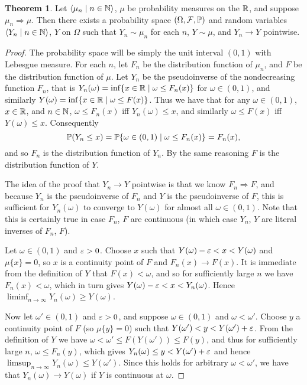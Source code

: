 \documentclass[leqno]{article}
\theoremstyle{definition}
\newtheorem{theorem}{Theorem}[section]
\newcommand{\bldset}[2]{\{{#1}\mid{#2}\}}
\newcommand{\bldseq}[2]{\langle{#1}\mid{#2}\rangle}
\begin{document}
\begin{theorem}
Let $\bldseq{\mu_n}{n \in \N}$, $\mu$ be probability measures on the $\R$, and suppose $\mu_n \Rightarrow \mu$. Then there exists a probability space $(\Omega, \mathcal F, \P)$ and random variables $\bldseq{Y_n}{n \in \N}$, $Y$ on $\Omega$ such that $Y_n \sim \mu_n$ for each $n$, $Y \sim \mu$, and $Y_n \rightarrow Y$ pointwise.
\end{theorem}

\begin{proof}
The probability space will be simply the unit interval $(0,1)$ with Lebesgue measure. For each $n$, let $F_n$ be the distribution function of $\mu_n$, and $F$ be the distribution function of $\mu$. Let $Y_n$ be the pseudoinverse of the nondecreasing function $F_n$, that is $Y_n(\omega) = \inf \bldset{x \in \R}{\omega \le F_n(x)}$ for $\omega \in (0,1)$, and similarly $Y(\omega) = \inf \bldset{x \in \R}{\omega \le F(x)}$. Thus we have that for any $\omega \in (0,1)$, $x \in \R$, and $n \in \N$, $\omega \le F_n(x)$ iff $Y_n(\omega) \le x$, and similarly $\omega \le F(x)$ iff $Y(\omega) \le x$. Consequently
\[ \P(Y_n \le x) = \P \bldset{\omega \in (0,1)}{\omega \le F_n(x)} = F_n(x), \]
and so $F_n$ is the distribution function of $Y_n$. By the same reasoning $F$ is the distribution function of $Y$.

The idea of the proof that $Y_n \rightarrow Y$ pointwise is that we know $F_n \Rightarrow F$, and because $Y_n$ is the pseudoinverse of $F_n$ and $Y$ is the pseudoinverse of $F$, this is sufficient for $Y_n(\omega)$ to converge to $Y(\omega)$ for almost all $\omega \in (0,1)$. Note that this is certainly true in case $F_n$, $F$ are continuous (in which case $Y_n$, $Y$ are literal inverses of $F_n$, $F$).

Let $\omega \in (0,1)$ and $\eps > 0$. Choose $x$ such that $Y(\omega) - \eps < x < Y(\omega)$ and $\mu \{x\} = 0$, so $x$ is a continuity point of $F$ and $F_n(x) \rightarrow F(x)$. It is immediate from the definition of $Y$ that $F(x) < \omega$, and so for sufficiently large $n$ we have $F_n(x) < \omega$, which in turn gives $Y(\omega) - \eps < x < Y_n(\omega)$. Hence $\liminf_{n \rightarrow \infty} Y_n(\omega) \ge Y(\omega)$.

Now let $\omega' \in (0,1)$ and $\eps > 0$, and suppose $\omega \in (0,1)$ and $\omega < \omega'$. Choose $y$ a continuity point of $F$ (so $\mu \{y\} = 0$) such that $Y(\omega') < y < Y(\omega') + \eps$. From the definition of $Y$ we have $\omega < \omega' \le F(Y(\omega')) \le F(y)$, and thus for sufficiently large $n$, $\omega \le F_n(y)$, which gives $Y_n(\omega) \le y < Y(\omega') + \eps$ and hence $\limsup_{n \rightarrow \infty} Y_n(\omega) \le Y(\omega')$. Since this holds for arbitrary $\omega < \omega'$, we have that $Y_n(\omega) \rightarrow Y(\omega)$ if $Y$ is continuous at $\omega$.


\end{proof}
\end{document}
